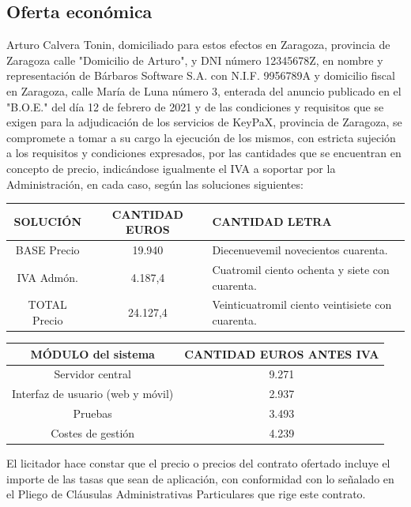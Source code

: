 \documentclass{article}
\begin{document}
\subsection{Oferta económica}

Arturo Calvera Tonin, domiciliado para estos efectos en Zaragoza, provincia de Zaragoza calle "Domicilio de Arturo", y DNI número 12345678Z, en nombre y representación de Bárbaros Software S.A. con N.I.F. 9956789A y domicilio fiscal en Zaragoza, calle María de Luna número 3, enterada del anuncio publicado en el "B.O.E." del día 12 de febrero de 2021 y de las condiciones y requisitos que se exigen para la adjudicación de los servicios de KeyPaX, provincia de Zaragoza, se compromete a tomar a su cargo la ejecución de los mismos, con estricta sujeción a los requisitos y condiciones expresados, por las cantidades que se encuentran en concepto de precio, indicándose igualmente el IVA a soportar por la Administración, en cada caso, según las soluciones siguientes:

\begin{table}[H]
    \centering
    \begin{tabular}{| c | c | p{15em} |}
    \hline
        SOLUCIÓN &  CANTIDAD EUROS & CANTIDAD LETRA \\ \hline
        BASE Precio & 19.940 & Diecenuevemil novecientos cuarenta.\\ \hline
        IVA Admón. &  4.187,4 & Cuatromil ciento ochenta y siete con cuarenta.\\ \hline
        TOTAL Precio &  24.127,4 & Veinticuatromil ciento veintisiete con cuarenta.\\ \hline
    \end{tabular}
\end{table}

\begin{table}[H]
    \centering
    \begin{tabular}{| c | c |}
    \hline
        MÓDULO del sistema &  CANTIDAD EUROS ANTES IVA \\ \hline
        Servidor central & 9.271 \\ \hline
        Interfaz de usuario (web y móvil) &  2.937 \\ \hline
        Pruebas &  3.493 \\ \hline
        Costes de gestión &  4.239 \\ \hline
    \end{tabular}
\end{table}

El licitador hace constar que el precio o precios del contrato ofertado incluye el importe de las tasas que sean de aplicación, con conformidad con lo señalado en el Pliego de Cláusulas Administrativas Particulares que rige este contrato.
\end{document}
